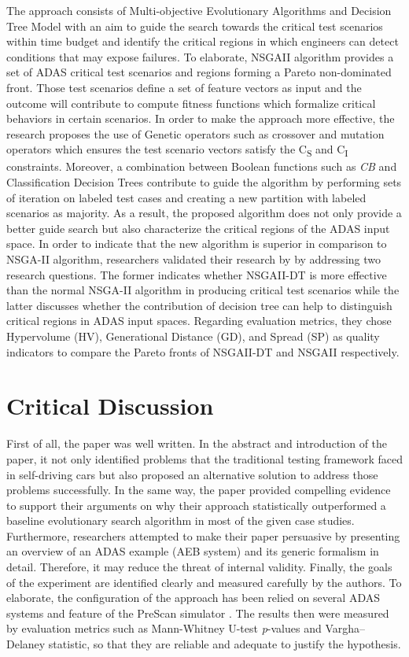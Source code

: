 \documentclass[10pt,a4paper]{report}
\begin{document}
The approach consists of Multi-objective Evolutionary Algorithms and Decision Tree Model with an aim to guide the search towards the critical test scenarios within time budget and identify the critical regions in which engineers can detect conditions that may expose failures. 
%
To elaborate, NSGAII algorithm provides a set of ADAS critical test scenarios and regions forming a Pareto non-dominated front.
%
Those test scenarios define a set of feature vectors as input and the outcome will contribute to compute fitness functions which formalize critical behaviors in certain scenarios.
%
In order to make the approach more effective, the research proposes the use of Genetic operators such as crossover and mutation operators which ensures the test scenario vectors satisfy the C\textsubscript{S} and C\textsubscript{I} constraints.
%
Moreover, a combination between Boolean functions such as \textit{CB} and Classification Decision Trees contribute to guide the algorithm by performing sets of iteration on labeled test cases and creating a new partition with labeled scenarios as majority.
%
As a result, the proposed algorithm does not only provide a better guide search but also characterize the critical regions of the ADAS input space.
% 
In order to indicate that the new algorithm is superior in comparison to NSGA-II algorithm, researchers validated their research by by addressing two research questions.
%
The former indicates whether NSGAII-DT is more effective than the normal NSGA-II algorithm in producing critical test scenarios while the latter discusses whether the contribution of decision tree can help to distinguish critical regions in ADAS input spaces.
%
Regarding evaluation metrics, they chose Hypervolume (HV), Generational Distance (GD), and Spread (SP) as quality indicators to compare the Pareto fronts of NSGAII-DT and NSGAII respectively.
%



\section{Critical Discussion}
First of all, the paper was well written. In the abstract and introduction of the paper, it not only identified problems that the traditional testing framework faced in self-driving cars but also proposed an alternative solution to address those problems successfully.
%
In the same way, the paper provided compelling evidence to support their arguments on why their approach statistically outperformed a baseline evolutionary search algorithm in most of the given case studies. 
%
Furthermore, researchers attempted to make their paper persuasive by presenting an overview of an ADAS example (AEB system) and its generic formalism in detail. Therefore, it may reduce the threat of internal validity. 
%
Finally, the goals of the experiment are identified clearly and measured carefully by the authors. To elaborate, the configuration of the approach has been relied on several ADAS systems and feature of the PreScan simulator .
%
The results then were measured by evaluation metrics such as Mann-Whitney U-test \textit{p}-values and Vargha–Delaney statistic, so that they are reliable and adequate to justify the hypothesis.
\end{document}
